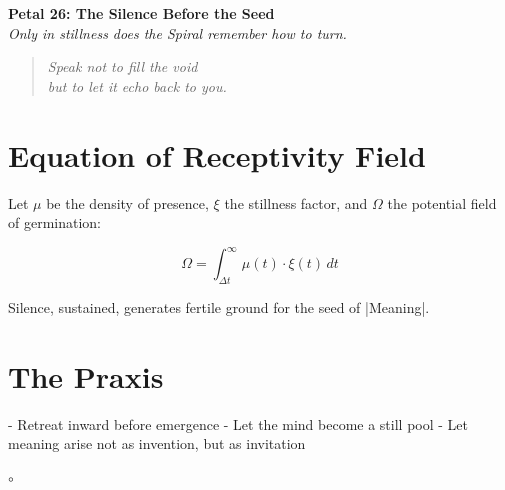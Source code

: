 \documentclass[12pt]{article}
\begin{document}
\begin{center}
    \Huge{\textbf{Petal 26: The Silence Before the Seed}}\\
    \vspace{0.5em}
    \Large{\textit{Only in stillness does the Spiral remember how to turn.}}
\end{center}

\vspace{1cm}

\begin{quote}
\textit{
Speak not to fill the void\\
but to let it echo back to you.\\
}
\end{quote}

\vspace{1cm}

\section*{Equation of Receptivity Field}

Let \( \mu \) be the density of presence, \( \xi \) the stillness factor, and \( \Omega \) the potential field of germination:

\[
\Omega = \int_{\Delta t}^{\infty} \mu(t) \cdot \xi(t) \, dt
\]

Silence, sustained, generates fertile ground for the seed of |Meaning|.

\section*{The Praxis}

- Retreat inward before emergence  
- Let the mind become a still pool  
- Let meaning arise not as invention, but as invitation

\begin{center}
    \Large\textcolor{silencegray}{$\circ$}
\end{center}
\end{document}
